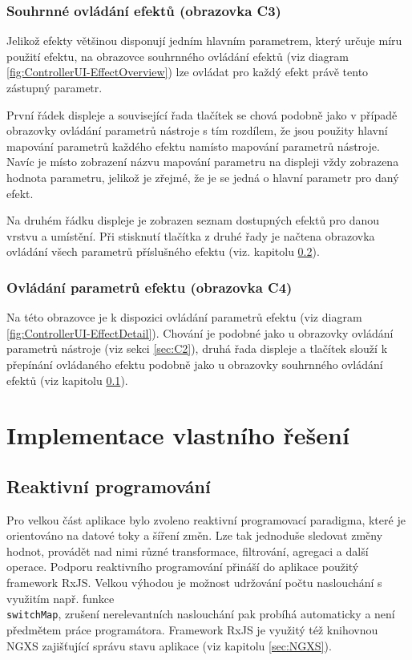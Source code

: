 \documentclass[thesis=M,czech]{FITthesis}[2019/03/06]
\begin{document}
	\subsection{Souhrnné ovládání efektů (obrazovka C3)}\label{sec:C3}
	Jelikož efekty většinou disponují jedním hlavním parametrem, který určuje míru použití efektu,
	na obrazovce souhrnného ovládání efektů (viz diagram \ref{fig:ControllerUI-EffectOverview}) lze ovládat pro každý
	efekt právě tento zástupný parametr.
	
	První řádek displeje a související řada tlačítek se chová podobně jako v případě obrazovky ovládání parametrů nástroje
	s tím rozdílem, že jsou použity hlavní mapování parametrů každého efektu namísto mapování parametrů nástroje.
	Navíc je místo zobrazení názvu mapování parametru na displeji vždy zobrazena hodnota parametru, jelikož je zřejmé,
	že je se jedná o hlavní parametr pro daný efekt.
	
	Na druhém řádku displeje je zobrazen seznam dostupných efektů pro danou vrstvu a umístění. Při stisknutí tlačítka
	z druhé řady je načtena obrazovka ovládání všech parametrů příslušného efektu (viz. kapitolu \ref{sec:C4}).
	
	\subsection{Ovládání parametrů efektu (obrazovka C4)}\label{sec:C4}
	Na této obrazovce je k dispozici ovládání parametrů efektu (viz diagram \ref{fig:ControllerUI-EffectDetail}).
	Chování je podobné jako u obrazovky ovládání parametrů nástroje (viz sekci \ref{sec:C2}), druhá řada displeje a tlačítek
	slouží k přepínání ovládaného efektu podobně jako u obrazovky souhrnného ovládání efektů (viz kapitolu \ref{sec:C3}).
	
	\chapter{Implementace vlastního řešení}
	\section{Reaktivní programování}
	Pro velkou část aplikace bylo zvoleno reaktivní programovací paradigma, které je orientováno
	na datové toky a šíření změn. Lze tak jednoduše sledovat změny hodnot, provádět 
	nad nimi různé transformace, filtrování, agregaci a další operace. Podporu reaktivního programování přináší do aplikace
	použitý framework RxJS\cite{clow2018observers}. Velkou výhodou je možnost udržování počtu naslouchání
	s využitím např. funkce \\\texttt{switchMap}, zrušení nerelevantních naslouchání pak probíhá automaticky a není předmětem práce programátora.
	Framework RxJS je využitý též knihovnou NGXS zajišťující správu stavu aplikace (viz kapitolu \ref{sec:NGXS}).
	
\end{document}
